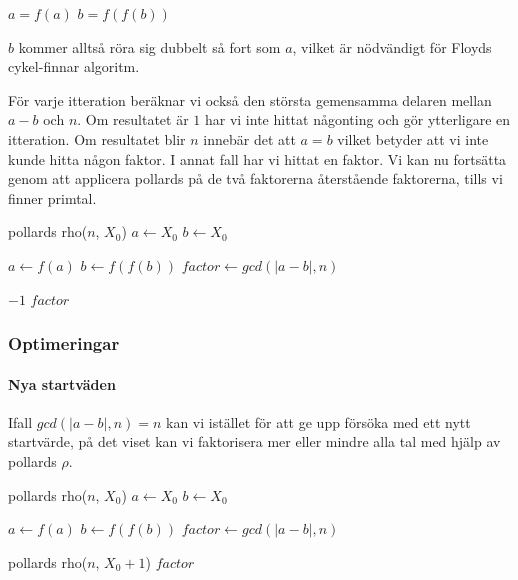\documentclass[a4paper,12pt]{article}
\renewcommand{\*}{\ensuremath{\cdot}}
\begin{document}
$a = f(a)$
$b = f(f(b))$

$b$ kommer alltså röra sig dubbelt så fort som $a$, vilket är nödvändigt för Floyds cykel-finnar algoritm.

För varje itteration beräknar vi också den största gemensamma delaren mellan $a-b$ och $n$. Om resultatet är $1$ har vi inte hittat någonting och gör ytterligare en itteration. Om resultatet blir $n$ innebär det att $a=b$ vilket betyder att vi inte kunde hitta någon faktor. I annat fall har vi hittat en faktor. Vi kan nu fortsätta genom att applicera pollards på de två faktorerna återstående faktorerna, tills vi finner primtal.

\begin{algorithmic}
    \STATE pollards rho($n$, $X_0$)
        \STATE $a \gets X_0 $
        \STATE $b \gets X_0 $

            \STATE $a \gets f(a)$
            \STATE $b \gets f(f(b))$
            \STATE $factor \gets gcd(|a-b|, n)$
        \ENDWHILE

            \STATE {}
            \RETURN $-1$ 
            \RETURN $factor$
        \ENDIF
\end{algorithmic}


\subsubsection{Optimeringar}
\paragraph{Nya startväden}

Ifall $gcd(|a-b|, n) = n$ kan vi istället för att ge upp försöka med ett nytt startvärde, på det viset kan vi faktorisera mer eller mindre alla tal med hjälp av pollards $\rho$.

\begin{algorithmic}
    \STATE pollards rho($n$, $X_0$)
        \STATE $a \gets X_0 $
        \STATE $b \gets X_0 $

            \STATE $a \gets f(a)$
            \STATE $b \gets f(f(b))$
            \STATE $factor \gets gcd(|a-b|, n)$
        \ENDWHILE

            \STATE {}
            \RETURN pollards rho($n$, $X_0+1$) 
            \RETURN $factor$
        \ENDIF
\end{algorithmic}
\end{document}
